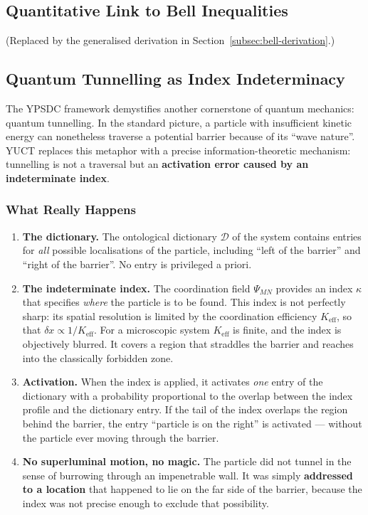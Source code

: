 \documentclass[12pt,a4paper]{article}
\theoremstyle{remark}
\begin{document}
	
	\subsection{Quantitative Link to Bell Inequalities}
	\label{subsec:bell-inequalities}
	
	(Replaced by the generalised derivation in Section~\ref{subsec:bell-derivation}.)
	
	\subsection{Quantum Tunnelling as Index Indeterminacy}
	
	The YPSDC framework demystifies another cornerstone of quantum
	mechanics: quantum tunnelling.  In the standard picture, a particle
	with insufficient kinetic energy can nonetheless traverse a potential
	barrier because of its ``wave nature''.  YUCT replaces this
	metaphor with a precise information-theoretic mechanism: tunnelling
	is not a traversal but an \textbf{activation error caused by an
		indeterminate index}.
	
	\subsubsection{What Really Happens}
	
	\begin{enumerate}[leftmargin=*]
		\item \textbf{The dictionary.}
		The ontological dictionary $\mathcal{D}$ of the system contains
		entries for \emph{all} possible localisations of the particle,
		including ``left of the barrier'' and ``right of the barrier''.
		No entry is privileged a priori.
		
		\item \textbf{The indeterminate index.}
		The coordination field $\Psi_{MN}$ provides an index $\kappa$
		that specifies \emph{where} the particle is to be found.  This
		index is not perfectly sharp: its spatial resolution is limited
		by the coordination efficiency $K_{\mathrm{eff}}$, so that
		$\delta x \propto 1/K_{\mathrm{eff}}$.  For a microscopic system
		$K_{\mathrm{eff}}$ is finite, and the index is objectively
		blurred.  It covers a region that straddles the barrier and
		reaches into the classically forbidden zone.
		
		\item \textbf{Activation.}
		When the index is applied, it activates \emph{one} entry of
		the dictionary with a probability proportional to the overlap
		between the index profile and the dictionary entry.  If the tail
		of the index overlaps the region behind the barrier, the entry
		``particle is on the right'' is activated --- without the
		particle ever moving through the barrier.
		
		\item \textbf{No superluminal motion, no magic.}
		The particle did not tunnel in the sense of burrowing through
		an impenetrable wall.  It was simply \textbf{addressed to a
			location} that happened to lie on the far side of the barrier,
		because the index was not precise enough to exclude that
		possibility.
	\end{enumerate}
	
\end{document}
